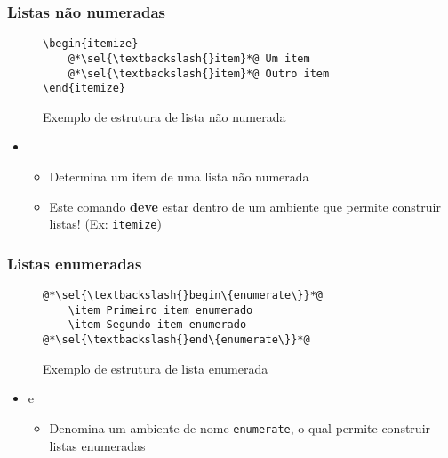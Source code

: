 \begin{frame}[fragile] \frametitle{Listas não numeradas}
\begin{figure}[!t]
\caption{Exemplo de estrutura de lista não numerada}
\begin{lstlisting}
\begin{itemize}
	@*\sel{\textbackslash{}item}*@ Um item
	@*\sel{\textbackslash{}item}*@ Outro item
\end{itemize}
\end{lstlisting}
\ownsrc
\end{figure}

\begin{itemize}
	\item {}
	\begin{itemize}
		\item Determina um item de uma lista não numerada
		\item Este comando \textbf{deve} estar dentro de um ambiente que permite construir listas! (Ex: \texttt{itemize})
	\end{itemize}
\end{itemize}
\end{frame}

\begin{frame}[fragile] \frametitle{Listas enumeradas}
\begin{figure}[!t]
\caption{Exemplo de estrutura de lista enumerada}
\begin{lstlisting}
@*\sel{\textbackslash{}begin\{enumerate\}}*@
	\item Primeiro item enumerado
	\item Segundo item enumerado
@*\sel{\textbackslash{}end\{enumerate\}}*@
\end{lstlisting}
\ownsrc
\end{figure}

\begin{itemize}
	\item {} e 
	\begin{itemize}
		\item Denomina um ambiente de nome \texttt{enumerate}, o qual permite construir listas enumeradas
	\end{itemize}
\end{itemize}
\end{frame}

